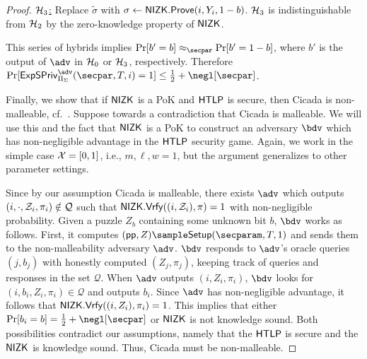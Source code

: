 \begin{proof}
    \underline{$\mathcal{H}_3$:} Replace $\tilde{\sigma}$ with $\sigma \gets \mathsf{NIZK}.\mathsf{Prove}(i, Y_i, 1-b)$. $\mathcal{H}_3$ is indistinguishable from $\mathcal{H}_2$ by the zero-knowledge property of $\sf NIZK$.

    This series of hybrids implies $\Pr[b'=b] \approx_\secpar \Pr[b'=1-b]$, where $b'$ is the output of $\adv$ in $\mathcal{H}_0$ or $\mathcal{H}_3$, respectively. Therefore $\Pr[\Exp = 1] \leq \frac{1}{2} + \negl[\secpar]$.
    


    Finally, we show that if $\mathsf{NIZK}$ is a PoK and $\mathsf{HTLP}$ is secure, then Cicada is non-malleable, cf.~. Suppose towards a contradiction that Cicada is malleable. We will use this and the fact that $\mathsf{NIZK}$ is a PoK to construct an adversary $\bdv$ which has non-negligible advantage in the $\mathsf{HTLP}$ security game. Again, we work in the simple case $\mathcal{X} = [0,1]$, i.e., $m,\ell,w=1$, but the argument generalizes to other parameter settings.
    
    Since by our assumption Cicada is malleable, there exists $\adv$ which outputs $(i, \cdot, \mathcal{Z}_i, \pi_i) \notin \mathcal{Q}$ such that $\mathsf{NIZK}.\mathsf{Vrfy}((i,\allowbreak \mathcal{Z}_i), \pi)=1$ with non-negligible probability. 
    Given a puzzle $Z_b$ containing some unknown bit $b$, $\bdv$ works as follows. First, it computes $(\pparam, Z) \sample \Setup(\secparam, \Ttime, 1)$ and sends them to the non-malleability adversary $\adv$. $\bdv$ responds to $\adv$'s oracle queries $(j, b_j)$ with honestly computed $(Z_j, \pi_j)$, keeping track of queries and responses in the set $\mathcal{Q}$. When $\adv$ outputs $(i, Z_i, \pi_i)$, $\bdv$ looks for $(i, b_i, Z_i, \pi_i) \in \mathcal{Q}$ and outputs $b_i$. Since $\adv$ has non-negligible advantage, it follows that $\mathsf{NIZK}.\mathsf{Vrfy}((i, Z_i), \pi_i) = 1$. This implies that either $\Pr[b_i=b] = \frac{1}{2} + \negl[\secpar]$ or $\mathsf{NIZK}$ is not knowledge sound. Both possibilities contradict our assumptions, namely that the $\mathsf{HTLP}$ is secure and the $\mathsf{NIZK}$ is knowledge sound. Thus, Cicada must be non-malleable.
\end{proof}